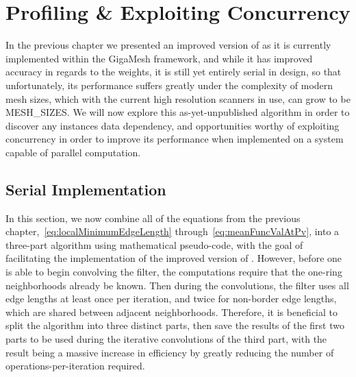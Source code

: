\chapter{Profiling \& Exploiting Concurrency}
\label{ch5}
In the previous chapter we presented an improved version of  as it is currently implemented within the GigaMesh framework, and while it has improved accuracy in regards to the weights, it is still yet entirely serial in design, so that unfortunately, its performance suffers greatly under the complexity of modern mesh sizes, which with the current high resolution scanners in use, can grow to be MESH\_SIZES. We will now explore this as-yet-unpublished algorithm in order to discover any instances data dependency, and opportunities worthy of exploiting concurrency in order to improve its performance when implemented on a system capable of parallel computation.

%
%
%
%
\section{Serial Implementation}
\label{ch5sSI}
In this section, we now combine all of the equations from the previous chapter,~\ref{eq:localMinimumEdgeLength} through~\ref{eq:meanFuncValAtPv}, into a three-part algorithm using mathematical pseudo-code, with the goal of facilitating the implementation of the improved version of . However, before one is able to begin convolving the filter, the computations require that the one-ring neighborhoods already be known. Then during the convolutions, the filter uses all edge lengths at least once per iteration, and twice for non-border edge lengths, which are shared between adjacent neighborhoods. Therefore, it is beneficial to split the algorithm into three distinct parts, then save the results of the first two parts to be used during the iterative convolutions of the third part, with the result being a massive increase in efficiency by greatly reducing the number of operations-per-iteration required.

%
%

